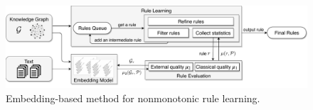    \begin{figure}[t]
\centering
\includegraphics[width=1\textwidth]{figures/rules_overview_H.pdf}
\caption{Embedding-based method for nonmonotonic rule learning.}
\label{fig:system_RulES}
\end{figure}

